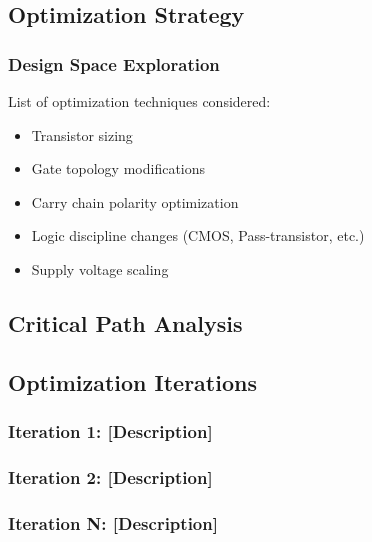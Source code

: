 \documentclass[12pt,letterpaper]{article}
\begin{document}
\subsection{Optimization Strategy}

\subsubsection{Design Space Exploration}

List of optimization techniques considered:
\begin{itemize}
    \item Transistor sizing
    \item Gate topology modifications
    \item Carry chain polarity optimization
    \item Logic discipline changes (CMOS, Pass-transistor, etc.)
    \item Supply voltage scaling
\end{itemize}

\subsection{Critical Path Analysis}


\subsection{Optimization Iterations}

\subsubsection{Iteration 1: [Description]}


\subsubsection{Iteration 2: [Description]}

\subsubsection{Iteration N: [Description]}
\end{document}
